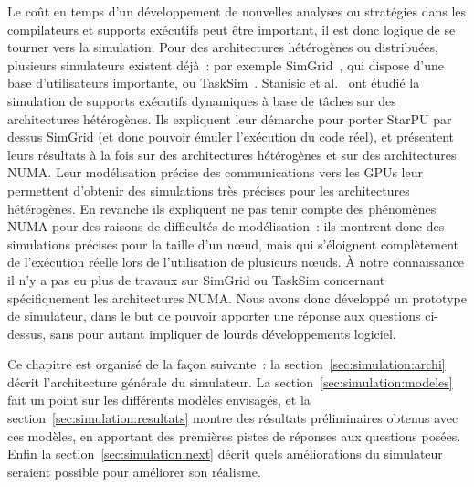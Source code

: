 Le coût en temps d'un développement de nouvelles analyses ou stratégies dans les compilateurs et supports exécutifs peut être important, il est donc logique de se tourner vers la simulation.
Pour des architectures hétérogènes ou distribuées, plusieurs simulateurs existent déjà~: par exemple SimGrid~\cite{Casanova2001}, qui dispose d'une base d'utilisateurs importante, ou TaskSim~\cite{Rico2010}.
Stanisic et al.~\cite{Stanisic2015} ont étudié la simulation de supports exécutifs dynamiques à base de tâches sur des architectures hétérogènes.
Ils expliquent leur démarche pour porter StarPU par dessus SimGrid (et donc pouvoir émuler l'exécution du code réel), et présentent leurs résultats à la fois sur des architectures hétérogènes et sur des architectures NUMA.
Leur modélisation précise des communications vers les GPUs leur permettent d'obtenir des simulations très précises pour les architectures hétérogènes.
En revanche ils expliquent ne pas tenir compte des phénomènes NUMA pour des raisons de difficultés de modélisation~: ils montrent donc des simulations précises pour la taille d'un nœud, mais qui s'éloignent complètement de l'exécution réelle lors de l'utilisation de plusieurs nœuds.
À notre connaissance il n'y a pas eu plus de travaux sur SimGrid ou TaskSim concernant spécifiquement les architectures NUMA.
Nous avons donc développé un prototype de simulateur, dans le but de pouvoir apporter une réponse aux questions ci-dessus, sans pour autant impliquer de lourds développements logiciel.

Ce chapitre est organisé de la façon suivante~: la section~\ref{sec:simulation:archi} décrit l'architecture générale du simulateur.
La section~\ref{sec:simulation:modeles} fait un point sur les différents modèles envisagés, et la section~\ref{sec:simulation:resultats} montre des résultats préliminaires obtenus avec ces modèles, en apportant des premières pistes de réponses aux questions posées.
Enfin la section~\ref{sec:simulation:next} décrit quels améliorations du simulateur seraient possible pour améliorer son réalisme.


